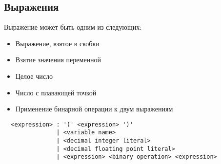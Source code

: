 \documentclass{amsart}
\begin{document}
  \subsection{Выражения}
  Выражение может быть одним из следующих:

  \begin{itemize}
      \item Выражение, взятое в скобки
      \item Взятие значения переменной
      \item Целое число
      \item Число с плавающей точкой
      \item Применение бинарной операции к двум выражениям
  \end{itemize}

  \begin{lstlisting}
  <expression> : '(' <expression> ')'
               | <variable name> 
               | <decimal integer literal>
               | <decimal floating point literal>
               | <expression> <binary operation> <expression>
  \end{lstlisting}
\end{document}
